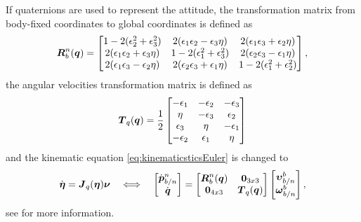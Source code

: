 
If quaternions are used to represent the attitude, the transformation matrix from body-fixed coordinates to global coordinates is defined as 
\begin{equation}
\boldsymbol{R}^n_b(\boldsymbol{q}) = \begin{bmatrix}
  1 - 2(\epsilon_2^2 + \epsilon_3^2) & 2(\epsilon_1\epsilon_2 - \epsilon_3\eta)   & 2(\epsilon_1\epsilon_3 + \epsilon_2\eta) \\
     2(\epsilon_1\epsilon_2 + \epsilon_3\eta) &  1-2(\epsilon_1^2 + \epsilon_3^2) & 2(\epsilon_2\epsilon_3-\epsilon_1\eta)    \\
     2(\epsilon_1\epsilon_3 - \epsilon_2\eta) &  2(\epsilon_2\epsilon_3 + \epsilon_1\eta)  & 1-2(\epsilon_1^2 + \epsilon_2^2) \\
\end{bmatrix},
\end{equation} the angular velocities transformation matrix is defined as
\begin{equation} \label{eq:Tquat}
\boldsymbol{T}_q(\boldsymbol{q}) = \frac{1}{2}
\begin{bmatrix}
-\epsilon_1  & -\epsilon_2  & -\epsilon_3 \\
\eta   & -\epsilon_3 & \epsilon_2 \\
\epsilon_3 & \eta    &  -\epsilon_1 \\
-\epsilon_2 & \epsilon_1    & \eta \\
\end{bmatrix}
\end{equation}
and the kinematic equation \eqref{eq:kinematicsticsEuler} is changed to 
\begin{equation}
\dot{\boldsymbol{\eta}} = \boldsymbol{J}_q(\boldsymbol{\eta})\boldsymbol{\nu}
\quad\Longleftrightarrow\quad
\begin{bmatrix}
\dot{\boldsymbol{p}}^n_{b/n} \\
\dot{\boldsymbol{q}}
\end{bmatrix}
=
\begin{bmatrix}
\boldsymbol{R}^n_b(\boldsymbol{q}) & \boldsymbol{0}_{3x3} \\
\boldsymbol{0}_{4x3} & \boldsymbol{T}_q(\boldsymbol{q})
\end{bmatrix}
\begin{bmatrix}
\boldsymbol{\upsilon}^b_{b/n} \\
\boldsymbol{\omega}^b_{b/n}
\end{bmatrix},
\end{equation}
see \citet[Ch. 2]{fossen2011} for more information. 
